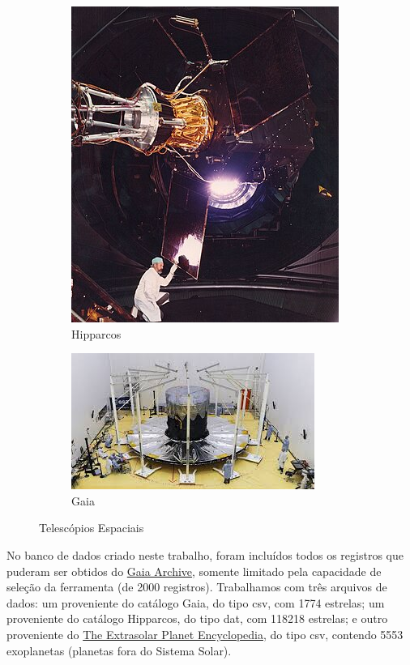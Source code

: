 \documentclass[12pt, a4paper]{article}
\begin{document}
	\begin{figure}[H]
		\begin{subfigure}{.5\textwidth}
			\centering
			\includegraphics[width=.7\linewidth]{Hipparcos.png}
			\caption*{Hipparcos}
		\end{subfigure}%
		\begin{subfigure}{.5\textwidth}
			\centering
			\includegraphics[width=1\linewidth]{Gaia.png}
			\caption*{Gaia}
		\end{subfigure}
		\caption{Telescópios Espaciais}
	\end{figure}

	No banco de dados criado neste trabalho, foram incluídos todos os registros que puderam ser obtidos do \href{https://gea.esac.esa.int/archive/}{Gaia Archive}, somente limitado pela capacidade de seleção da ferramenta (de 2000 registros). Trabalhamos com três arquivos de dados: um proveniente do catálogo Gaia, do tipo csv, com 1774 estrelas; um proveniente do catálogo Hipparcos, do tipo dat, com 118218 estrelas; e outro proveniente do \href{http://www.exoplanet.eu/}{The Extrasolar Planet Encyclopedia}, do tipo csv, contendo 5553 exoplanetas (planetas fora do Sistema Solar).
	
\end{document}
